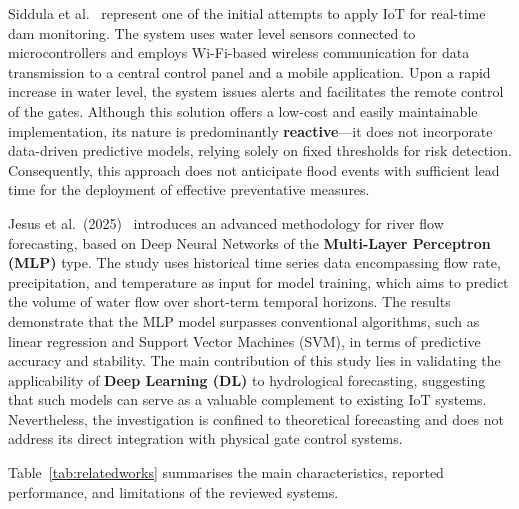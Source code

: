 Siddula et al.~\cite{ref3} represent one of the initial attempts to apply IoT for real-time dam monitoring. The system uses water level sensors connected to microcontrollers and employs Wi-Fi-based wireless communication for data transmission to a central control panel and a mobile application. Upon a rapid increase in water level, the system issues alerts and facilitates the remote control of the gates. Although this solution offers a low-cost and easily maintainable implementation, its nature is predominantly \textbf{reactive}---it does not incorporate data-driven predictive models, relying solely on fixed thresholds for risk detection. Consequently, this approach does not anticipate flood events with sufficient lead time for the deployment of effective preventative measures.

Jesus et al.~(2025)~\cite{ref4} introduces an advanced methodology for river flow forecasting, based on Deep Neural Networks of the \textbf{Multi-Layer Perceptron (MLP)} type. The study uses historical time series data encompassing flow rate, precipitation, and temperature as input for model training, which aims to predict the volume of water flow over short-term temporal horizons. The results demonstrate that the MLP model surpasses conventional algorithms, such as linear regression and Support Vector Machines (SVM), in terms of predictive accuracy and stability. The main contribution of this study lies in validating the applicability of \textbf{Deep Learning (DL)} to hydrological forecasting, suggesting that such models can serve as a valuable complement to existing IoT systems. Nevertheless, the investigation is confined to theoretical forecasting and does not address its direct integration with physical gate control systems.

Table~\ref{tab:relatedworks} summarises the main characteristics, reported performance, and limitations of the reviewed systems.

